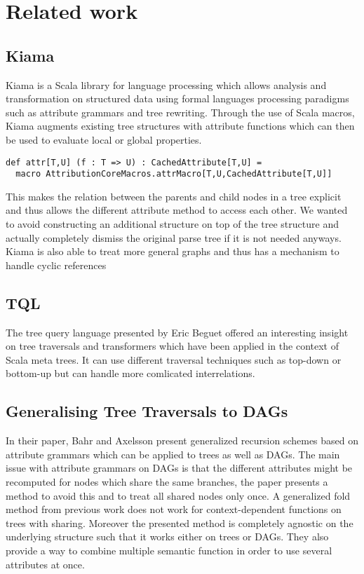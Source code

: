 \section{Related work}
\subsection{Kiama}
Kiama is a Scala library for language processing which allows analysis and transformation on structured data using formal languages processing paradigms such as attribute grammars and tree rewriting.
Through the use of Scala macros, Kiama augments existing tree structures with attribute functions which can then be used to evaluate local or global properties.\\
\begin{verbatim}def attr[T,U] (f : T => U) : CachedAttribute[T,U] =
  macro AttributionCoreMacros.attrMacro[T,U,CachedAttribute[T,U]]\end{verbatim}
This makes the relation between the parents and child nodes in a tree explicit and thus allows the different attribute method to access each other. We wanted to avoid constructing an additional structure on top of the tree structure and actually completely dismiss the original parse tree if it is not needed anyways.
Kiama is also able to treat more general graphs and thus has a mechanism to handle cyclic references


\subsection{TQL}
The tree query language presented by Eric Beguet offered an interesting insight on tree traversals and transformers which have been applied in the context of Scala meta trees. It can use different traversal techniques such as top-down or bottom-up but can handle more comlicated interrelations.

\subsection{Generalising Tree Traversals to DAGs}
In their paper, Bahr and Axelsson present generalized recursion schemes based on attribute grammars which can be applied to trees as well as DAGs. The main issue with attribute grammars on DAGs is that the different attributes might be recomputed for nodes which share the same branches, the paper presents a method to avoid this and to treat all shared nodes only once. A generalized fold method from previous work does not work for context-dependent functions on trees with sharing. Moreover the presented method is completely agnostic on the underlying structure such that it works either on trees or DAGs.
They also provide a way to combine multiple semantic function in order to use several attributes at once.

